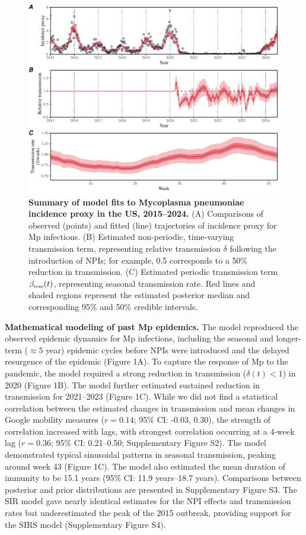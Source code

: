 \documentclass[12pt]{article}
\newcommand{\tsub}[2]{#1_{{\textrm{\tiny #2}}}}
\begin{document}
\begin{figure}[!ht]
\includegraphics[width=\textwidth]{../figure1/figure1_new.pdf}
\caption{
\textbf{Summary of model fits to Mycoplasma pneumoniae incidence proxy in the US, 2015--2024.}
(A) Comparisons of observed (points) and fitted (line) trajectories of incidence proxy for Mp infections.
(B) Estimated non-periodic, time-varying transmission term, representing relative transmission $\delta$ following the introduction of NPIs; 
for example, 0.5 corresponds to a 50\% reduction in transmission.
(C) Estimated periodic transmission term  $\tsub{\beta}{seas}(t)$, representing seasonal transmission rate.
Red lines and shaded regions represent the estimated posterior median and corresponding 95\% and 50\% credible intervals.
}
\end{figure}

\textbf{Mathematical modeling of past Mp epidemics.}
The model reproduced the observed epidemic dynamics for Mp infections, including the seasonal and longer-term ($\approx 5$ year) epidemic cycles before NPIs were introduced and the delayed resurgence of the epidemic (Figure 1A).
To capture the response of Mp to the pandemic, the model required a strong reduction in transmission ($\delta(t) < 1$) in 2020 (Figure 1B).
The model further estimated sustained reduction in transmission for 2021--2023 (Figure 1C).
While we did not find a statistical correlation between the estimated changes in transmission and mean changes in Google mobility measures ($r=0.14$; 95\% CI: -0.03, 0.30),
the strength of correlation increased with lags, with strongest correlation occurring at a 4-week lag  ($r=0.36$; 95\% CI: 0.21--0.50; Supplementary Figure S2).
The model demonstrated typical sinusoidal patterns in seasonal transmission, peaking around week 43 (Figure 1C).
The model also estimated the mean duration of immunity to be 15.1 years (95\% CI: 11.9 years--18.7 years).
Comparisons between posterior and prior distributions are presented in Supplementary Figure S3. 
The SIR model gave nearly identical estimates for the NPI effects and transmission rates but underestimated the peak of the 2015 outbreak, providing support for the SIRS model (Supplementary Figure S4).
\end{document}
